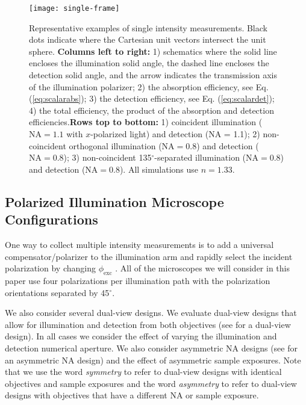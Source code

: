 \documentclass[10pt]{article}
\begin{document}
\begin{figure}[H]
\centering\texttt{[image: single-frame]}
\caption{Representative examples of single intensity measurements. Black dots
  indicate where the Cartesian unit vectors intersect the unit sphere. \newline \newline \textbf{Columns left to right:} 1) schematics where
  the solid line encloses the illumination solid angle, the dashed line encloses
  the detection solid angle, and the arrow indicates the transmission axis of
  the illumination polarizer; 2) the absorption efficiency, see {\color{urlblue}Eq.}
  (\ref{eq:scalarabs}); 3) the detection efficiency, see {\color{urlblue}Eq.}
  (\ref{eq:scalardet}); 4) the total efficiency, the product of the absorption
  and detection efficiencies.\newline \newline \textbf{Rows top to bottom:} 1)
  coincident illumination ($\text{NA} = 1.1$ with $x$-polarized light) and
  detection (NA = 1.1); 2) non-coincident orthogonal illumination
  ($\text{NA} = 0.8$) and detection ($\text{NA} = 0.8$); 3) non-coincident
  135${}^{\circ}$-separated illumination ($\text{NA} = 0.8$) and detection
  ($\text{NA} = 0.8$). All simulations use $n=1.33$.}
  \label{fig:single-frame}
\end{figure}

\subsection{Polarized Illumination Microscope Configurations}\label{designs}
One way to collect multiple intensity measurements is to add a universal
compensator/polarizer to the illumination arm and rapidly select the incident
polarization by changing $\phi_{\text{exc}}$ \cite{shribak2003}. All of the
microscopes we will consider in this paper use four polarizations per
illumination path with the polarization orientations separated by
45${}^{\circ}$.

We also consider several dual-view designs. We evaluate dual-view designs that
allow for illumination and detection from both objectives (see \cite{wu2013} for
a dual-view design). In all cases we consider the effect of varying the
illumination and detection numerical aperture. We also consider asymmetric NA
designs (see \cite{wu2017} for an asymmetric NA design) and the effect of
asymmetric sample exposures. Note that we use the word \emph{symmetry} to refer
to dual-view designs with identical objectives and sample exposures and the word
\emph{asymmetry} to refer to dual-view designs with objectives that have a
different NA or sample exposure.
\end{document}
